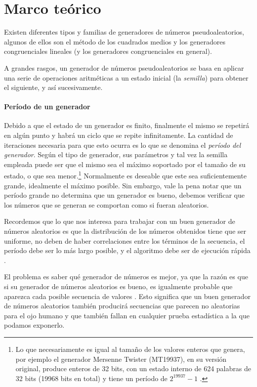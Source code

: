 \section{Marco teórico}
Existen diferentes tipos y familias de generadores de números pseudoaleatorios, algunos de ellos son el método de los cuadrados medios y los generadores congruenciales lineales (y los generadores congruenciales en general).

A grandes rasgos, un generador de números pseudoaleatorios se basa en aplicar una serie de operaciones aritméticas a un estado inicial (la \emph{semilla}) para obtener el siguiente, y así sucesivamente.

\paragraph{Período de un generador}
Debido a que el estado de un generador es finito, finalmente el mismo se repetirá en algún punto y habrá un ciclo que se repite infinitamente. La cantidad de iteraciones necesaria para que esto ocurra es lo que se denomina el \emph{período del generador}. Según el tipo de generador, sus parámetros y tal vez la semilla empleada puede ser que el mismo sea el máximo soportado por el tamaño de su estado, o que sea menor.\footnote{Lo que necesariamente es igual al tamaño de los valores enteros que genera, por ejemplo el generador Mersenne Twister (MT19937), en su versión original, produce enteros de 32 bits, con un estado interno de 624 palabras de 32 bits (19968 bits en total) y tiene un período de $2^{19937}-1$ \cite{matsumoto1998mersenne}.} Normalmente es deseable que este sea suficientemente grande, idealmente el máximo posible. Sin embargo, vale la pena notar que un período grande no determina que un generador es bueno, debemos verificar que los números que se generan se comportan como si fueran aleatorios.

Recordemos que lo que nos interesa para trabajar con un buen generador de números aleatorios es que la distribución de los números obtenidos tiene que ser uniforme, no deben de haber correlaciones entre los términos de la secuencia, el período debe ser lo más largo posible, y el algoritmo debe ser de ejecución rápida \cite{webfisica2004generacion}.

El problema es saber qué generador de números es mejor, ya que la razón es que si su generador de números aleatorios es bueno, es igualmente probable que aparezca cada posible secuencia de valores \cite{randomorganalysis}. Esto significa que un buen generador de números aleatorios también producirá secuencias que parecen no aleatorias para el ojo humano y que también fallan en cualquier prueba estadística a la que podamos exponerlo.

